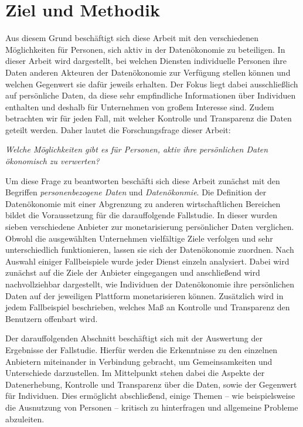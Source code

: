 \section{Ziel und Methodik}
Aus diesem Grund beschäftigt sich diese Arbeit mit den verschiedenen Möglichkeiten für Personen, sich aktiv in der Datenökonomie zu beteiligen. In dieser Arbeit wird dargestellt, bei welchen Diensten individuelle Personen ihre Daten anderen Akteuren der Datenökonomie zur Verfügung stellen können und welchen Gegenwert sie dafür jeweils erhalten. Der Fokus liegt dabei ausschließlich auf persönliche Daten, da diese sehr empfindliche Informationen über Individuen enthalten und deshalb für Unternehmen von großem Interesse sind. Zudem betrachten wir für jeden Fall, mit welcher Kontrolle und Transparenz die Daten geteilt werden. Daher lautet die Forschungsfrage dieser Arbeit:

\begin{center}
\textit{Welche Möglichkeiten gibt es für Personen, aktiv ihre persönlichen Daten ökonomisch zu verwerten?}
\end{center}

\noindent Um diese Frage zu beantworten beschäfti sich diese Arbeit zunächst mit den Begriffen \textit{personenbezogene Daten} und \textit{Datenökonmie}. Die Definition der Datenökonomie mit einer Abgrenzung zu anderen wirtschaftlichen Bereichen bildet die Voraussetzung für die darauffolgende Fallstudie. In dieser wurden sieben verschiedene Anbieter zur monetarisierung persönlicher Daten verglichen. Obwohl die ausgewählten Unternehmen vielfältige Ziele verfolgen und sehr unterschiedlich funktionieren, lassen sie sich der Datenökonomie zuordnen. Nach Auswahl einiger Fallbeispiele wurde jeder Dienst einzeln analysiert. Dabei wird zunächst auf die Ziele der Anbieter eingegangen und anschließend wird nachvollziehbar dargestellt, wie Individuen der Datenökonomie ihre persönlichen Daten auf der jeweiligen Plattform monetarisieren können. Zusätzlich wird in jedem Fallbeispiel beschrieben, welches Maß an Kontrolle und Transparenz den Benutzern offenbart wird. \newline

\noindent Der darauffolgenden Abschnitt beschäftigt sich mit der Auswertung der Ergebnisse der Fallstudie. Hierfür werden die Erkenntnisse zu den einzelnen Anbietern miteinander in Verbindung gebracht, um Gemeinsamkeiten und Unterschiede darzustellen. Im Mittelpunkt stehen dabei die Aspekte der Datenerhebung, Kontrolle und Transparenz über die Daten, sowie der Gegenwert für Individuen. Dies ermöglicht abschließend, einige Themen -- wie beispielsweise die Ausnutzung von Personen -- kritisch zu hinterfragen und allgemeine Probleme abzuleiten. 
